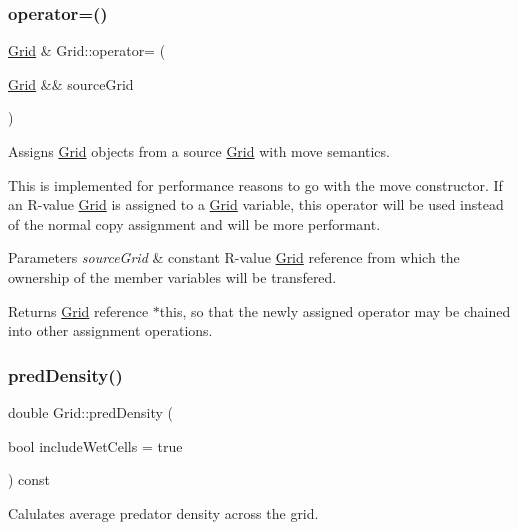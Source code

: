 \subsubsection{\texorpdfstring{operator=()}{operator=()}\hspace{0.1cm}{\footnotesize\ttfamily [2/2]}}
{\footnotesize\ttfamily \hyperlink{class_grid}{Grid} \& Grid\+::operator= (\begin{DoxyParamCaption}\item[{\hyperlink{class_grid}{Grid} \&\&}]{source\+Grid }\end{DoxyParamCaption})}



Assigns \hyperlink{class_grid}{Grid} objects from a source \hyperlink{class_grid}{Grid} with move semantics. 

This is implemented for performance reasons to go with the move constructor. If an R-\/value \hyperlink{class_grid}{Grid} is assigned to a \hyperlink{class_grid}{Grid} variable, this operator will be used instead of the normal copy assignment and will be more performant.


\begin{DoxyParams}{Parameters}
{\em source\+Grid} & constant R-\/value \hyperlink{class_grid}{Grid} reference from which the ownership of the member variables will be transfered.\\
\hline
\end{DoxyParams}
\begin{DoxyReturn}{Returns}
\hyperlink{class_grid}{Grid} reference $\ast$this, so that the newly assigned operator may be chained into other assignment operations. 
\end{DoxyReturn}
\mbox{\label{class_grid_a25eeb1fef1d86fe74b45e615f0376158}} 
\subsubsection{\texorpdfstring{pred\+Density()}{predDensity()}}
{\footnotesize\ttfamily double Grid\+::pred\+Density (\begin{DoxyParamCaption}\item[{bool}]{include\+Wet\+Cells = {\ttfamily true} }\end{DoxyParamCaption}) const}



Calulates average predator density across the grid. 

